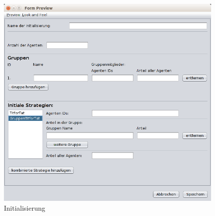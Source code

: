 \begin{figure}[hp] 
  \centering
     \includegraphics[width=1.1\textwidth]{GUI_Entwurf/NeueInitialisierung.png}
  \caption{Initialisierung}
  \label{fig:Bild1}
\end{figure}


